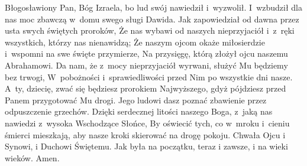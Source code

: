 \relax
\startlines\startnarrower[0mm]%
Błogosławiony Pan, Bóg Izraela,\pmed
bo lud swój nawiedził i~wyzwolił.\pfin
I~wzbudził dla nas moc zbawczą\pmed
w~domu swego sługi Dawida.\pfin
Jak zapowiedział od dawna\pmed
przez usta swych świętych proroków,\pfin
Że nas wybawi od naszych nieprzyjaciół\pmed
i~z~ręki wszystkich, którzy nas nienawidzą;\pfin
Że naszym ojcom okaże miłosierdzie\pmed
i~wspomni na swe święte przymierze,\pfin
Na przysięgę, którą złożył\pmed
ojcu naszemu Abrahamowi.\pfin
Da nam, że z~mocy nieprzyjaciół wyrwani,\pmed
służyć Mu będziemy bez trwogi,\pfin
W~pobożności i~sprawiedliwości przed Nim\pmed
po wszystkie dni nasze.\pfin
A~ty, dziecię, zwać się będziesz prorokiem Najwyższego,\pmed
gdyż pójdziesz przed Panem przygotować Mu drogi.\pfin
Jego ludowi dasz poznać zbawienie\pmed
przez odpuszczenie grzechów.\pfin
Dzięki serdecznej litości naszego Boga,\pmed
z~jaką nas nawiedzi z~wysoka Wschodzące Słońce,\pfin
By oświecić tych, co w~mroku i~cieniu śmierci mieszkają,\pmed
aby nasze kroki skierować na drogę pokoju.\pfin
Chwała Ojcu i Synowi,\pmed
i Duchowi Świętemu.\pfin
Jak była na początku, teraz i zawsze,\pmed
i na wieki wieków. Amen.\pfin\stopnarrower\stoplines
\endinput

